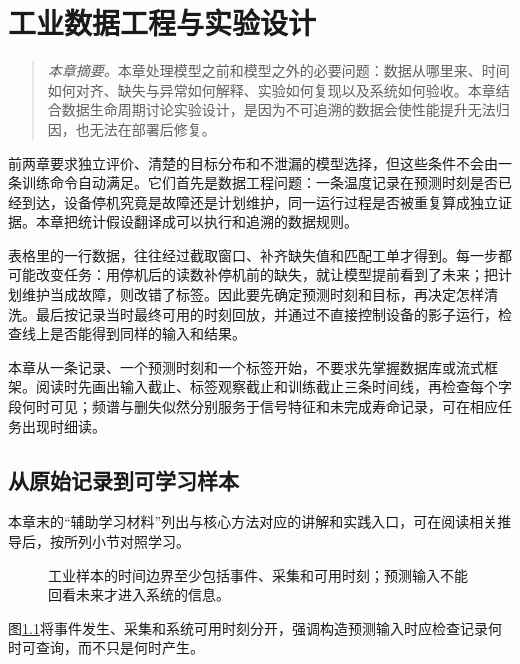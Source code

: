 ﻿\chapter{工业数据工程与实验设计}

\begin{quote}\small
\textit{本章摘要。}本章处理模型之前和模型之外的必要问题：数据从哪里来、时间如何对齐、缺失与异常如何解释、实验如何复现以及系统如何验收。本章结合数据生命周期讨论实验设计，是因为不可追溯的数据会使性能提升无法归因，也无法在部署后修复。
\end{quote}

前两章要求独立评价、清楚的目标分布和不泄漏的模型选择，但这些条件不会由一条训练命令自动满足。它们首先是数据工程问题：一条温度记录在预测时刻是否已经到达，设备停机究竟是故障还是计划维护，同一运行过程是否被重复算成独立证据。本章把统计假设翻译成可以执行和追溯的数据规则。

表格里的一行数据，往往经过截取窗口、补齐缺失值和匹配工单才得到。每一步都可能改变任务：用停机后的读数补停机前的缺失，就让模型提前看到了未来；把计划维护当成故障，则改错了标签。因此要先确定预测时刻和目标，再决定怎样清洗。最后按记录当时最终可用的时刻回放，并通过不直接控制设备的影子运行，检查线上是否能得到同样的输入和结果。

本章从一条记录、一个预测时刻和一个标签开始，不要求先掌握数据库或流式框架。阅读时先画出输入截止、标签观察截止和训练截止三条时间线，再检查每个字段何时可见；频谱与删失似然分别服务于信号特征和未完成寿命记录，可在相应任务出现时细读。

\section{从原始记录到可学习样本}

本章末的“辅助学习材料”列出与核心方法对应的讲解和实践入口，可在阅读相关推导后，按所列小节对照学习。

\begin{figure}[htbp]
\centering
{}
\caption{工业样本的时间边界至少包括事件、采集和可用时刻；预测输入不能回看未来才进入系统的信息。}
\label{fig:data-availability-timeline}
\end{figure}
图\ref{fig:data-availability-timeline}将事件发生、采集和系统可用时刻分开，强调构造预测输入时应检查记录何时可查询，而不只是何时产生。
